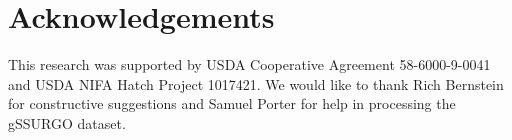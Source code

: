 \documentclass[letterpaper]{article} %
\begin{document}
\begin{abstract}
\end{abstract}



% 









\section{Acknowledgements}

This research was supported by USDA Cooperative Agreement 58-6000-9-0041 and USDA NIFA Hatch Project 1017421. We would like to thank Rich Bernstein for constructive suggestions and Samuel Porter for help in processing the gSSURGO dataset.



\clearpage
\appendix


\end{document}

